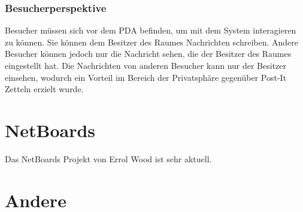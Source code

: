 \subsubsection{Besucherperspektive}
Besucher müssen sich vor dem PDA befinden, um mit dem System interagieren zu können. Sie können dem Besitzer des Raumes Nachrichten schreiben. Andere Besucher können jedoch nur die Nachricht sehen, die der Besitzer des Raumes eingestellt hat. Die Nachrichten von anderen Besucher kann nur der Besitzer einsehen, wodurch ein Vorteil im Bereich der Privatsphäre gegenüber Post-It Zetteln erzielt wurde.






\section{NetBoards}
Das NetBoards Projekt von Errol Wood\cite{wood:2014} ist sehr aktuell. 


\section{Andere}

% 
% 
